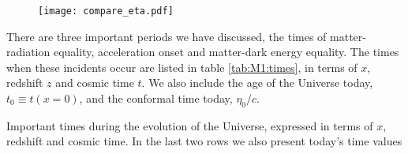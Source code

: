 \begin{figure}[ht!]
    \texttt{[image: compare\_eta.pdf]}
    \caption{}
    \label{fig:M1:eta}
\end{figure}


There are three important periods we have discussed, the times of matter-radiation equality, acceleration onset and matter-dark energy equality. The times when these incidents occur are listed in table \ref{tab:M1:times}, in terms of $x$, redshift $z$ and cosmic time $t$. We also include the age of the Universe today, $t_0\equiv t(x=0)$, and the conformal time today, $\eta_0/c$. 
\begin{table*}[ht!]
    \raggedright
    
    \label{tab:M1:times}
    \caption{Important times during the evolution of the Universe, expressed in terms of $x$, redshift and cosmic time. In the last two rows we also present today's time values}
\end{table*}